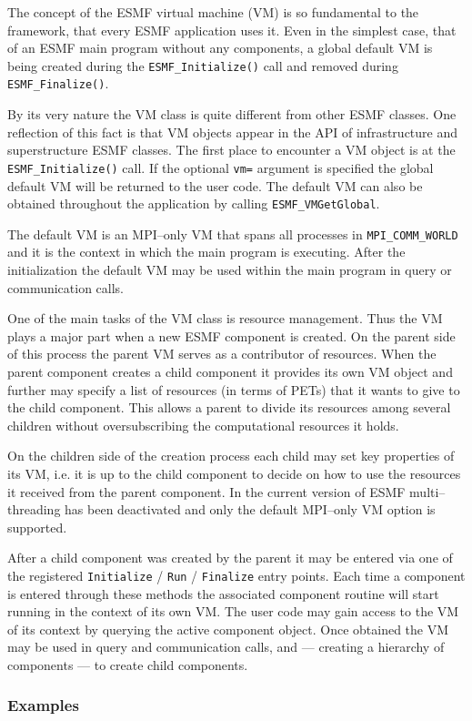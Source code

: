 
The concept of the ESMF virtual machine (VM) is so fundamental to the framework, that every ESMF application uses it. Even in the simplest case, that of an ESMF main program without any components, a global default VM is being created during the {\tt ESMF\_Initialize()} call and removed during {\tt ESMF\_Finalize()}.

By its very nature the VM class is quite different from other ESMF classes. One reflection of this fact is that VM objects appear in the API of infrastructure and superstructure ESMF classes. The first place to encounter a VM object is at the {\tt ESMF\_Initialize()} call. If the optional {\tt vm=} argument is specified the global default VM will be returned to the user code. The default VM can also be obtained throughout the application by calling {\tt ESMF\_VMGetGlobal}.

The default VM is an MPI--only VM that spans all processes in {\tt MPI\_COMM\_WORLD} and it is the context in which the main program is executing. After the initialization the default VM may be used within the main program in query or communication calls. 

One of the main tasks of the VM class is resource management. Thus the VM plays a major part when a new ESMF component is created. On the parent side of this process the parent VM serves as a contributor of resources. When the parent component creates a child component it provides its own VM object and further may specify a list of resources (in terms of PETs) that it wants to give to the child component. This allows a parent to divide its resources among several children without oversubscribing the computational resources it holds.

On the children side of the creation process each child may set key properties of its VM, i.e. it is up to the child component to decide on how to use the resources it received from the parent component. In the current version of ESMF multi--threading has been deactivated and only the default MPI--only VM option is supported.


After a child component was created by the parent it may be entered via one of the registered {\tt Initialize} / {\tt Run} / {\tt Finalize} entry points. Each time a component is entered through these methods the associated component routine will start running in the context of its own VM. The user code may gain access to the VM of its context by querying the active component object. Once obtained the VM may be used in query and communication calls, and --- creating a hierarchy of components --- to create child components.
 

\subsubsection{Examples}
